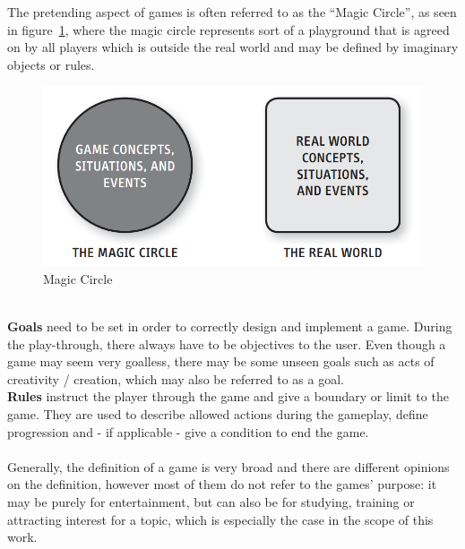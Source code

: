 The pretending aspect of games is often referred to as the ``Magic Circle'', as seen in figure~\ref{fig:magic-circle}, where the magic circle represents sort of a
playground that is agreed on by all players which is outside the real world and may be defined by imaginary objects or rules.
\begin{figure}
    \centering
    \includegraphics[width=\textwidth]{./Pictures/res/fundamentals/magic-circle}
    \caption{Magic Circle~\cite{10.5555/2544002}}
    \label{fig:magic-circle}
\end{figure}
\\
\textbf{Goals} need to be set in order to correctly design and implement a game.
During the play-through, there always have to be objectives to the user.
Even though a game may seem very goalless, there may be some unseen goals such as acts of creativity / creation, which may also be
referred to as a goal.
\\
\textbf{Rules} instruct the player through the game and give a boundary or limit to the game.
They are used to describe allowed actions during the gameplay, define progression and - if applicable - give a condition to
end the game.
\\ \\
Generally, the definition of a game is very broad and there are different opinions on the definition, however most of them
do not refer to the games' purpose: it may be purely for entertainment, but can also be for studying, training or attracting interest
for a topic, which is especially the case in the scope of this work.

